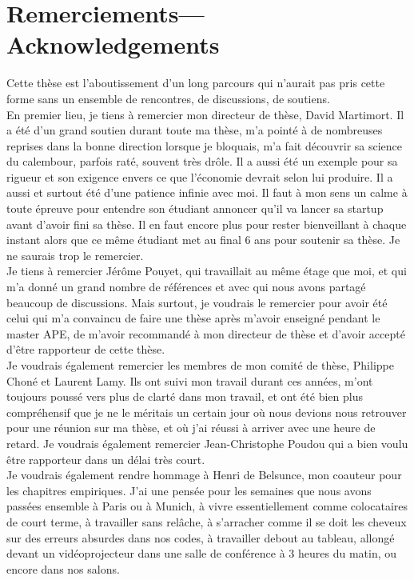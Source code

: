 \chapter*{Remerciements---Acknowledgements}
Cette thèse est l'aboutissement d'un long parcours qui n'aurait pas pris cette forme sans un ensemble de rencontres, de discussions, de soutiens.\\

En premier lieu, je tiens à remercier mon directeur de thèse, David Martimort. Il a été d'un grand soutien durant toute ma thèse, m'a pointé à de nombreuses reprises dans la bonne direction lorsque je bloquais, m'a fait découvrir sa science du calembour, parfois raté, souvent très drôle. Il a aussi été un exemple pour sa rigueur et son exigence envers ce que l'économie devrait selon lui produire. Il a aussi et surtout été d'une patience infinie avec moi. Il faut à mon sens un calme à toute épreuve pour entendre son étudiant annoncer qu'il va lancer sa startup avant d'avoir fini sa thèse. Il en faut encore plus pour rester bienveillant à chaque instant alors que ce même étudiant met au final 6 ans pour soutenir sa thèse. Je ne saurais trop le remercier. \\

Je tiens à remercier Jérôme Pouyet, qui travaillait au même étage que moi, et qui m'a donné un grand nombre de références et avec qui nous avons partagé beaucoup de discussions. Mais surtout, je voudrais le remercier pour avoir été celui qui m'a convaincu de faire une thèse après m'avoir enseigné pendant le master APE, de m'avoir recommandé à mon directeur de thèse et d'avoir accepté d'être rapporteur de cette thèse.\\

Je voudrais également remercier les membres de mon comité de thèse, Philippe Choné et Laurent Lamy. Ils ont suivi mon travail durant ces années, m'ont toujours poussé vers plus de clarté dans mon travail, et ont été bien plus compréhensif que je ne le méritais un certain jour où nous devions nous retrouver pour une réunion sur ma thèse, et où j'ai réussi à arriver avec une heure de retard. Je voudrais également remercier Jean-Christophe Poudou qui a bien voulu être rapporteur dans un délai très court.\\

Je voudrais également rendre hommage à Henri de Belsunce, mon coauteur pour les chapitres empiriques. J'ai une pensée pour les semaines que nous avons passées ensemble à Paris ou à Munich, à vivre essentiellement comme colocataires de court terme, à travailler sans relâche, à s'arracher comme il se doit les cheveux sur des erreurs absurdes dans nos codes, à travailler debout au tableau, allongé devant un vidéoprojecteur dans une salle de conférence à 3 heures du matin, ou encore dans nos salons. \\


